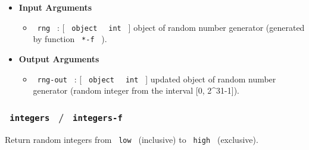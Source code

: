 \begin{itemize}
\item
  \textbf{Input Arguments}

  \begin{itemize}
  \tightlist
  \item
    \texttt{\ rng\ } : {[} \texttt{\ object\ } \textbar{}
    \texttt{\ int\ } {]} object of random number generator (generated by
    function \texttt{\ *-f\ } ).
  \end{itemize}
\item
  \textbf{Output Arguments}

  \begin{itemize}
  \tightlist
  \item
    \texttt{\ rng-out\ } : {[} \texttt{\ object\ } \textbar{}
    \texttt{\ int\ } {]} updated object of random number generator
    (random integer from the interval {[}0, 2\^{}31-1{]}).
  \end{itemize}
\end{itemize}

\subsubsection{\texorpdfstring{\texttt{\ integers\ } /
\texttt{\ integers-f\ }}{ integers  /  integers-f }}\label{integers-integers-f}

Return random integers from \texttt{\ low\ } (inclusive) to
\texttt{\ high\ } (exclusive).

\begin{Shaded}
\begin{Highlighting}[]
\end{Highlighting}
\end{Shaded}

